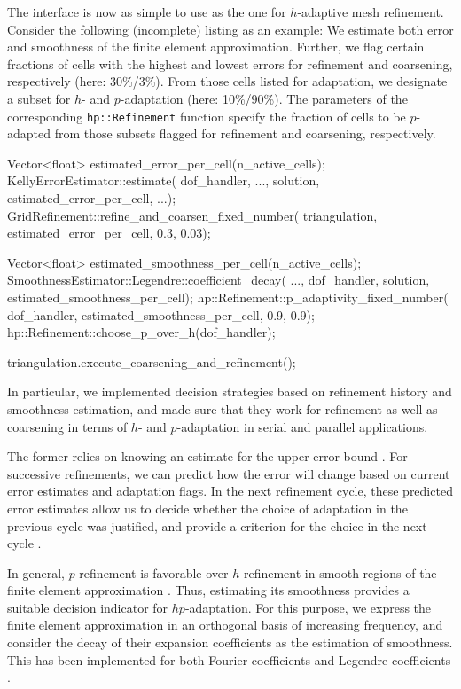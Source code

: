 \documentclass{ansarticle-preprint}
\begin{document}
The interface is now as simple to use as the one for $h$-adaptive mesh refinement.
Consider the following (incomplete) listing as an example: We estimate both error and
smoothness of the finite element approximation. Further, we flag certain fractions of
cells with the highest and lowest errors for refinement and coarsening, respectively
(here: 30\%/3\%). From those cells listed for adaptation, we designate a subset
for $h$- and $p$-adaptation (here: 10\%/90\%).
The parameters of the corresponding
\texttt{hp::Refinement} function specify the fraction of cells to be $p$-adapted from
those subsets flagged for refinement and coarsening, respectively.
\begin{c++}
Vector<float> estimated_error_per_cell(n_active_cells);
KellyErrorEstimator::estimate(
dof_handler, ..., solution, estimated_error_per_cell, ...);
GridRefinement::refine_and_coarsen_fixed_number(
triangulation, estimated_error_per_cell, 0.3, 0.03);

Vector<float> estimated_smoothness_per_cell(n_active_cells);
SmoothnessEstimator::Legendre::coefficient_decay(
..., dof_handler, solution, estimated_smoothness_per_cell);
hp::Refinement::p_adaptivity_fixed_number(
dof_handler, estimated_smoothness_per_cell, 0.9, 0.9);
hp::Refinement::choose_p_over_h(dof_handler);

triangulation.execute_coarsening_and_refinement();
\end{c++}

In particular, we implemented decision strategies based on refinement history and
smoothness estimation, and made sure that they work for refinement as well as
coarsening in terms of $h$- and $p$-adaptation in serial and parallel applications.

The former relies on knowing an estimate for the upper error bound \cite[Thm.~3.4]{BabuskaSuri1990}.
For successive refinements, we can predict how the error will change based on
current error estimates and adaptation flags. In the next refinement cycle, these
predicted error estimates allow us to decide whether the choice of adaptation in
the previous cycle was justified, and provide a criterion for the choice in the next
cycle \cite{MelenkWohlmuth2001}.

In general, $p$-refinement is favorable over $h$-refinement in smooth regions of
the finite element approximation \cite[Thm.~3.4]{BabuskaSuri1990}. Thus, estimating
its smoothness provides a suitable decision indicator for $hp$-adaptation. For this
purpose, we express the finite element approximation in an orthogonal
basis of increasing frequency, and consider the decay of their expansion
coefficients as the estimation of smoothness. This has been implemented for both
Fourier coefficients \cite{BangerthKayserHerold2007} and Legendre coefficients
\cite{Mavriplis1994,HoustonSeniorSueli2003,HoustonSueli2005,EibnerMelenk2007}.
\end{document}
